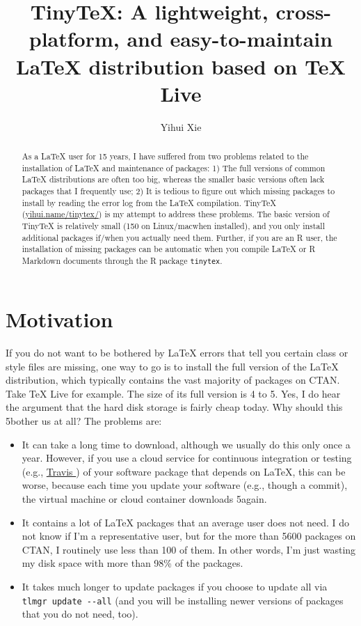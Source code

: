 \documentclass{tugboat}
\title{TinyTeX: A lightweight, cross-platform, and easy-to-maintain LaTeX
distribution based on TeX Live}
\author{Yihui Xie}
\def\macOS{mac\acro{OS}}
\def\GB{\acro{GB}}
\def\tinytex{\texttt{tinytex}}
\begin{document}
\maketitle

\begin{abstract}
As a \LaTeX{} user for 15 years, I have suffered from two problems related
to the installation of \LaTeX{} and maintenance of packages: 1) The full
versions of common \LaTeX{} distributions are often too big, whereas the
smaller basic versions often lack packages that I frequently use; 2) It
is tedious to figure out which missing packages to install by reading
the error log from the \LaTeX{} compilation. TinyTeX
(\url{yihui.name/tinytex/}) is my attempt to address these
problems. The basic version of TinyTeX is relatively small (150 on
Linux/\macOS when installed), and you only install additional packages
if/when you actually need them. Further, if you are an R user, the
installation of missing packages can be automatic when you compile \LaTeX{}
or R Markdown documents through the R package \tinytex{}.
\end{abstract}

\hypertarget{motivation}{%
\section{Motivation}\label{motivation}}

If you do not want to be bothered by \LaTeX{} errors that tell you certain
class or style files are missing, one way to go is to install the full
version of the \LaTeX{} distribution, which typically contains the vast
majority of packages on CTAN. Take \TeX{} Live for example. The size of its
full version is 4 to 5\GB. Yes, I do hear the argument that the hard disk
storage is fairly cheap today. Why should this 5\GB bother us at all? The
problems are:

\begin{itemize}
\item
  It can take a long time to download, although we usually do this only
  once a year. However, if you use a cloud service for continuous
  integration or testing (e.g., \href{https://travis-ci.org}{Travis })
  of your software package that depends on \LaTeX{}, this can be worse,
  because each time you update your software (e.g., though a 
  commit), the virtual machine or cloud container downloads 5\GB again.
\item
  It contains a lot of \LaTeX{} packages that an average user does not
  need. I do not know if I'm a representative user, but for the more
  than 5600 packages on CTAN, I routinely use less than 100 of them. In
  other words, I'm just wasting my disk space with more than 98\% of the
  packages.
\item
  It takes much longer to update packages if you choose to update all
  via \texttt{tlmgr\ update\ -\/-all} (and you will be installing newer
  versions of packages that you do not need, too).
\end{itemize}
\end{document}
